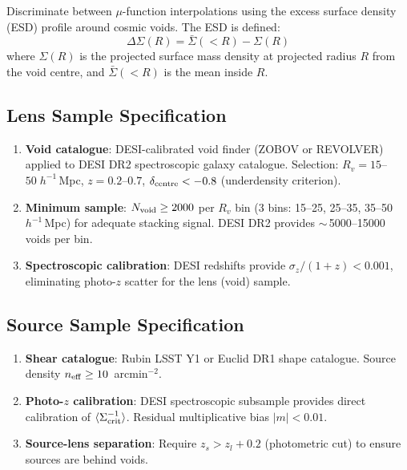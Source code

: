 \documentclass[11pt,a4paper]{article}
\begin{document}
Discriminate between $\mu$-function interpolations using the excess
surface density (ESD) profile around cosmic voids.  The ESD is defined:
\begin{equation}
\Delta\Sigma(R) = \bar{\Sigma}(<R) - \Sigma(R)
\end{equation}
where $\Sigma(R)$ is the projected surface mass density at projected
radius $R$ from the void centre, and $\bar{\Sigma}(<R)$ is the mean
inside $R$.

\subsection{Lens Sample Specification}

\begin{enumerate}[label=(\alph*)]
\item \textbf{Void catalogue}: DESI-calibrated void finder (ZOBOV or
  REVOLVER) applied to DESI DR2 spectroscopic galaxy catalogue.
  Selection: $R_v = 15$--$50\;h^{-1}$\,Mpc, $z = 0.2$--$0.7$,
  $\delta_{\rm centre} < -0.8$ (underdensity criterion).
\item \textbf{Minimum sample}: $N_{\rm void} \geq 2000$ per $R_v$ bin
  (3 bins: 15--25, 25--35, 35--50 $h^{-1}$\,Mpc) for adequate
  stacking signal.  DESI DR2 provides $\sim$\,5000--15000 voids per bin.
\item \textbf{Spectroscopic calibration}: DESI redshifts provide
  $\sigma_z/(1+z) < 0.001$, eliminating photo-$z$ scatter for the
  lens (void) sample.
\end{enumerate}

\subsection{Source Sample Specification}

\begin{enumerate}[label=(\alph*)]
\item \textbf{Shear catalogue}: Rubin LSST Y1 or Euclid DR1 shape
  catalogue.  Source density $n_{\rm eff} \geq 10$~arcmin$^{-2}$.
\item \textbf{Photo-$z$ calibration}: DESI spectroscopic subsample
  provides direct calibration of $\langle\Sigma_{\rm crit}^{-1}\rangle$.
  Residual multiplicative bias $|m| < 0.01$.
\item \textbf{Source-lens separation}: Require $z_s > z_l + 0.2$
  (photometric cut) to ensure sources are behind voids.
\end{enumerate}
\end{document}
